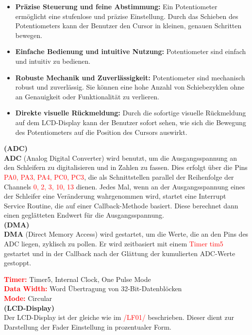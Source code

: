 \begin{itemize}
    \item \textbf{Präzise Steuerung und feine Abstimmung:} Ein Potentiometer ermöglicht eine stufenlose und präzise Einstellung. Durch das Schieben des Potentiometers kann der Benutzer den Cursor in kleinen, genauen Schritten bewegen.
    \item \textbf{Einfache Bedienung und intuitive Nutzung:} Potentiometer sind einfach und intuitiv zu bedienen.
    \item \textbf{Robuste Mechanik und Zuverlässigkeit:} Potentiometer sind mechanisch robust und zuverlässig. Sie können eine hohe Anzahl von Schiebezyklen ohne an Genauigkeit oder Funktionalität zu verlieren.
    \item \textbf{Direkte visuelle Rückmeldung:} Durch die sofortige visuelle Rückmeldung auf dem LCD-Display kann der Benutzer sofort sehen, wie sich die Bewegung des Potentiometers auf die Position des Cursors auswirkt.
\end{itemize}

\textbf{(ADC)}\\

\textbf{ADC} (Analog Digital Converter) wird benutzt, um die Ausgangsspannung an den Schleifern zu digitalisieren und in Zahlen zu fassen. Dies erfolgt über die Pins \textcolor{red}{PA0, PA3, PA4, PC0, PC3}, die als Schnittstellen parallel der Reihenfolge der Channels \textcolor{red}{0, 2, 3, 10, 13} dienen. Jedes Mal, wenn an der Ausgangsspannung eines der Schleifer eine Veränderung wahrgenommen wird, startet eine Interrupt Service Routine, die auf einer Callback-Methode basiert. Diese berechnet dann einen geglätteten Endwert für die Ausgangsspannung. \\

\textbf{(DMA)}\\

\textbf{DMA} (Direct Memory Access) wird gestartet, um die Werte, die an den Pins des ADC liegen, zyklisch zu pollen. Er wird zeitbasiert mit einem \textcolor{red}{Timer tim5} gestartet und in der Callback nach der Glättung der kumulierten ADC-Werte gestoppt.

\textbf{\textcolor{red}{Timer:}} Timer5, Internal Clock, One Pulse Mode \\
\textbf{\textcolor{red}{Data Width:}} Word Übertragung von 32-Bit-Datenblöcken \\
\textbf{\textcolor{red}{Mode:}} Circular \\

\textbf{(LCD-Display)}\\

Der LCD-Display ist der gleiche wie im \textcolor{red}{/LF01/} beschrieben. Dieser dient zur Darstellung der Fader Einstellung in prozentualer Form.